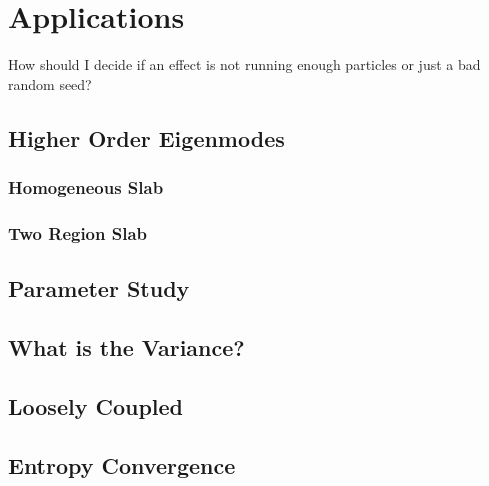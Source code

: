 \chapter{Applications \label{ch:Applications}}
How should I decide if an effect is not running enough particles or just a bad random seed?

\section{Higher Order Eigenmodes \label{sec:HigherOrderEigenmodes}}
\subsection{Homogeneous Slab} \label{sec:HomogeneousSlab}
\subsection{Two Region Slab} \label{sec:TwoRegionSlab}

\section{Parameter Study \label{sec:ParameterStudy}}

\section{What is the Variance? \label{sec:WhatIsVariance}}

\section{Loosely Coupled \label{sec:LooselyCoupled}}

\section{Entropy Convergence}
